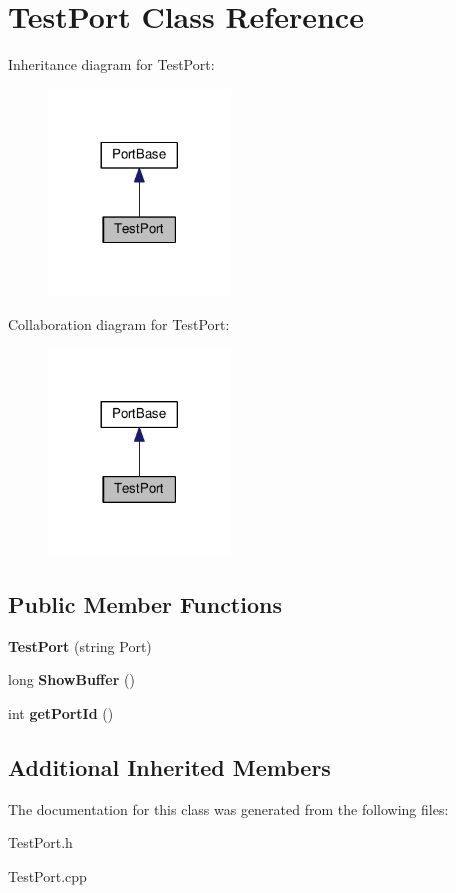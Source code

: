\hypertarget{classTestPort}{}\section{Test\+Port Class Reference}
\label{classTestPort}


Inheritance diagram for Test\+Port\+:
\nopagebreak
\begin{figure}[H]
\begin{center}
\leavevmode
\includegraphics[width=137pt]{classTestPort__inherit__graph}
\end{center}
\end{figure}


Collaboration diagram for Test\+Port\+:
\nopagebreak
\begin{figure}[H]
\begin{center}
\leavevmode
\includegraphics[width=137pt]{classTestPort__coll__graph}
\end{center}
\end{figure}
\subsection*{Public Member Functions}
\begin{DoxyCompactItemize}
\item 
\mbox{\label{classTestPort_a93293d14818c76db0b4ef1273cf5ce19}} 
{\bfseries Test\+Port} (string Port)
\item 
\mbox{\label{classTestPort_acc9bf1db6c1ca7d9040591306100ab36}} 
long {\bfseries Show\+Buffer} ()
\item 
\mbox{\label{classTestPort_abf6a7327e26838aaf3e2e4482668085f}} 
int {\bfseries get\+Port\+Id} ()
\end{DoxyCompactItemize}
\subsection*{Additional Inherited Members}


The documentation for this class was generated from the following files\+:\begin{DoxyCompactItemize}
\item 
Test\+Port.\+h\item 
Test\+Port.\+cpp\end{DoxyCompactItemize}
